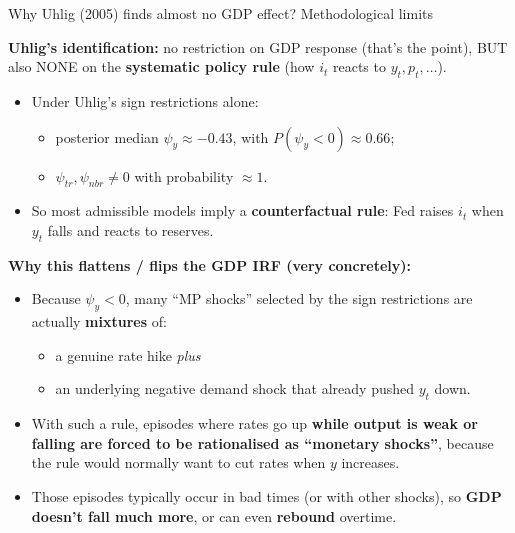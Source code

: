 \documentclass{beamer}
\begin{document}
\begin{frame}{Why Uhlig (2005) finds almost no GDP effect? Methodological limits}
\scriptsize

\textbf{Uhlig's identification:} no restriction on GDP response (that's the point), BUT also NONE on the \textbf{systematic policy rule} (how $i_t$ reacts to $y_t,p_t,\dots$).
\begin{itemize}
\textbf{What Arias - Caldara - Rubio-Ramírez (2016) show:} contemporaneous policy equation:
  \[
  i_t = \psi_y y_t + \psi_p p_t + \psi_{pc} pc_t + \psi_{tr} tr_t + \psi_{nbr} nbr_t + \varepsilon^{mp}_t
  \]

  \item Under Uhlig's sign restrictions alone:
    \begin{itemize}
    \scriptsize
      \item posterior median $\psi_y \approx -0.43$, with $P(\psi_y<0)\approx 0.66$;
      \item $\psi_{tr},\psi_{nbr} \neq 0$ with probability $\approx 1$.
    \end{itemize}
  \item So most admissible models imply a \textbf{counterfactual rule}: Fed raises $i_t$ when $y_t$ falls and reacts to reserves.
\end{itemize}

\medskip
\textbf{Why this flattens / flips the GDP IRF (very concretely):}
\begin{itemize}
\scriptsize
  \item Because $\psi_y<0$, many ``MP shocks'' selected by the sign restrictions are actually
        \textbf{mixtures} of:
        \begin{itemize}
        \scriptsize
          \item a genuine rate hike \emph{plus}
          \item an underlying negative demand shock that already pushed $y_t$ down.
        \end{itemize}
  \item With such a rule, episodes where rates go up \textbf{while output is weak or falling are forced to be rationalised as “monetary shocks”}, because the rule would normally want to cut rates when $y$ increases.
    \item Those episodes typically occur in bad times (or with other shocks), so \textbf{GDP doesn’t fall much more}, or can even \textbf{rebound} overtime. 
\end{itemize}
\end{frame}
\end{document}
